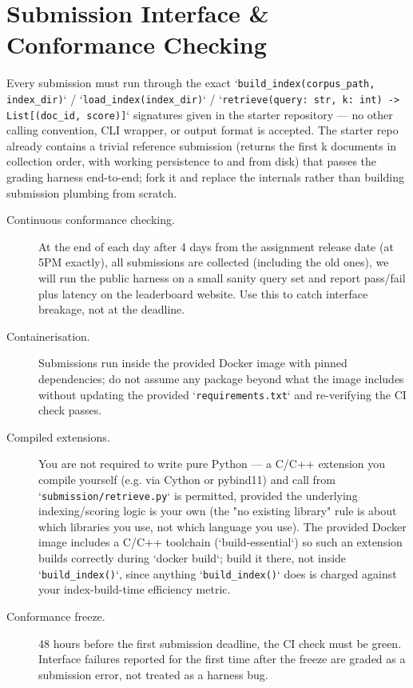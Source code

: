 \documentclass[10pt]{article}
\newcommand{\STARTDAY}{4\xspace}
\begin{document}
\section{Submission Interface \& Conformance Checking}

Every submission must run through the exact `\texttt{build\_index(corpus\_path, index\_dir)}` / `\texttt{load\_index(index\_dir)}` / `\texttt{retrieve(query: str, k: int) -> List[(doc\_id, score)]}` signatures given in the starter repository — no other calling convention, CLI wrapper, or output format is accepted. The starter repo already contains a trivial reference submission (returns the first k documents in collection order, with working persistence to and from disk) that passes the grading harness end-to-end; fork it and replace the internals rather than building submission plumbing from scratch.
\begin{description}
\item [Continuous conformance checking.] At the end of each day after \STARTDAY days from the assignment release date (at 5PM exactly), all submissions are collected (including the old ones), we will run the public harness on a small sanity query set and report pass/fail plus latency on the leaderboard website. Use this to catch interface breakage, not at the deadline. 
\item [Containerisation.] Submissions run inside the provided Docker image with pinned dependencies; do not assume any package beyond what the image includes without updating the provided `\texttt{requirements.txt}` and re-verifying the CI check passes.
\item [Compiled extensions.] You are not required to write pure Python — a C/C++ extension you compile yourself (e.g. via Cython or pybind11) and call from `\texttt{submission/retrieve.py}` is permitted, provided the underlying indexing/scoring logic is your own (the "no existing library" rule is about which libraries you use, not which language you use). The provided Docker image includes a C/C++ toolchain (`build-essential`) so such an extension builds correctly during `docker build`; build it there, not inside `\texttt{build\_index()}`, since anything `\texttt{build\_index()}` does is charged against your index-build-time efficiency metric.
\item [Conformance freeze.] 48 hours before the first submission deadline, the CI check must be green. Interface failures reported for the first time after the freeze are graded as a submission error, not treated as a harness bug.

\end{description}
\end{document}
